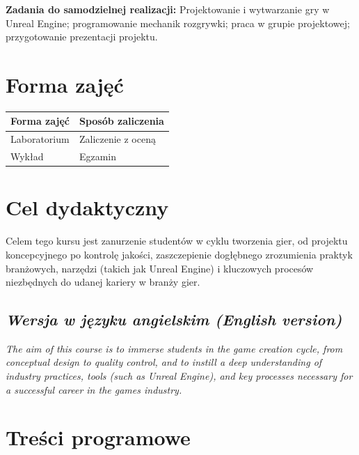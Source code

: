 \documentclass[12pt, a4paper]{article}
\begin{document}
\vspace{4pt}
\noindent\textbf{Zadania do samodzielnej realizacji:} Projektowanie i wytwarzanie gry w Unreal Engine; programowanie mechanik rozgrywki; praca w grupie projektowej; przygotowanie prezentacji projektu.

\section{Forma zajęć}

\begin{tabular}{ll}
  \hline
  \textbf{Forma zajęć} & \textbf{Sposób zaliczenia} \\
  \hline
  Laboratorium & Zaliczenie z oceną \\
  Wykład & Egzamin \\
  \hline
\end{tabular}

\section{Cel dydaktyczny}

Celem tego kursu jest zanurzenie studentów w cyklu tworzenia gier, od projektu koncepcyjnego po kontrolę jakości, zaszczepienie dogłębnego zrozumienia praktyk branżowych, narzędzi (takich jak Unreal Engine) i kluczowych procesów niezbędnych do udanej kariery w branży gier.

\subsection*{\textit{Wersja w języku angielskim (English version)}}

\textit{The aim of this course is to immerse students in the game creation cycle, from conceptual design to quality control, and to instill a deep understanding of industry practices, tools (such as Unreal Engine), and key processes necessary for a successful career in the games industry.}


\section{Treści programowe}
\end{document}
